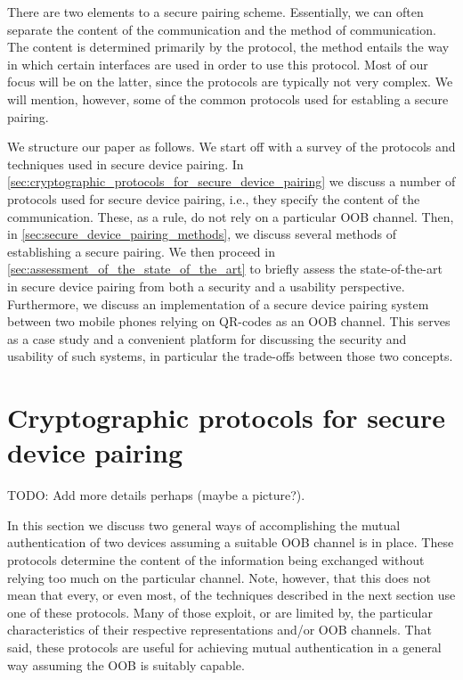\documentclass[conference, 12pt]{sty/IEEEtran}
\begin{document}
There are two elements to a secure pairing scheme.
Essentially, we can often separate the content of the communication and the method of communication.
The content is determined primarily by the protocol, the method entails the way in which certain interfaces are used in order to use this protocol.
Most of our focus will be on the latter, since the protocols are typically not very complex.
We will mention, however, some of the common protocols used for establing a secure pairing.

We structure our paper as follows.
We start off with a survey of the protocols and techniques used in secure device pairing.
In \autoref{sec:cryptographic_protocols_for_secure_device_pairing} we discuss a number of protocols used for secure device pairing, i.e., they specify the content of the communication.
These, as a rule, do not rely on a particular OOB channel.
Then, in \autoref{sec:secure_device_pairing_methods}, we discuss several methods of establishing a secure pairing.
We then proceed in \autoref{sec:assessment_of_the_state_of_the_art} to briefly assess the state-of-the-art in secure device pairing from both a security and a usability perspective.
Furthermore, we discuss an implementation of a secure device pairing system between two mobile phones relying on QR-codes as an OOB channel.
This serves as a case study and a convenient platform for discussing the security and usability of such systems, in particular the trade-offs between those two concepts.

\section{Cryptographic protocols for secure device pairing}
\label{sec:cryptographic_protocols_for_secure_device_pairing}

TODO: Add more details perhaps (maybe a picture?).

In this section we discuss two general ways of accomplishing the mutual authentication of two devices assuming a suitable OOB channel is in place.
These protocols determine the content of the information being exchanged without relying too much on the particular channel.
Note, however, that this does not mean that every, or even most, of the techniques described in the next section use one of these protocols.
Many of those exploit, or are limited by, the particular characteristics of their respective representations and/or OOB channels.
That said, these protocols are useful for achieving mutual authentication in a general way assuming the OOB is suitably capable.
\end{document}
